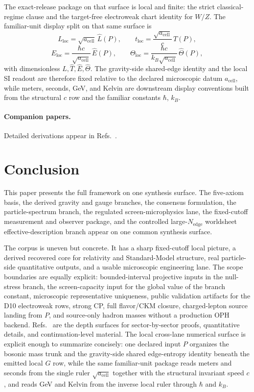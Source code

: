 The exact-release package on that surface is local and finite: the strict classical-regime clause
and the target-free electroweak chart identity for \(W/Z\).
The familiar-unit display split on that same surface is
\[
L_{\mathrm{loc}}=\sqrt{a_{\mathrm{cell}}}\,\widehat L(P),\qquad
t_{\mathrm{loc}}=\frac{\sqrt{a_{\mathrm{cell}}}}{c}\,\widehat T(P),
\]
\[
E_{\mathrm{loc}}=\frac{\hbar c}{\sqrt{a_{\mathrm{cell}}}}\,\widehat E(P),\qquad
\Theta_{\mathrm{loc}}=\frac{\hbar c}{k_B\sqrt{a_{\mathrm{cell}}}}\,\widehat\Theta(P),
\]
with dimensionless \(\widehat L,\widehat T,\widehat E,\widehat\Theta\). The gravity-side
shared-edge identity and the local SI readout are therefore fixed relative to the declared
microscopic datum \(a_{\mathrm{cell}}\), while meters, seconds, GeV, and Kelvin are downstream
display conventions built from the structural \(c\) row and the familiar constants \(\hbar\),
\(k_B\).

\paragraph{Companion papers.}
Detailed derivations appear in Refs.~\cite{ophcompact,ophconsensus,ophmicrophysics,ophparticles}.

\section{Conclusion}

This paper presents the full framework on one synthesis surface. The five-axiom basis, the
derived gravity and gauge branches, the consensus formulation, the particle-spectrum branch,
the regulated screen-microphysics lane, the fixed-cutoff measurement and observer package, and the
controlled large-\(N_{\mathrm{edge}}\) worldsheet effective-description branch appear on one
common synthesis surface.

The corpus is uneven but concrete. It has a sharp
fixed-cutoff local picture, a derived recovered core for relativity and Standard-Model
structure, real particle-side quantitative outputs, and a usable microscopic engineering lane. The
scope boundaries are equally explicit: bounded-interval projective inputs in the null-stress
branch, the screen-capacity input for the global value of the branch constant, microscopic
representative uniqueness, public validation artifacts for the D10 electroweak rows, strong CP,
full flavor/CKM closure, charged-lepton source landing from \(P\), and source-only hadron masses
without a production OPH backend.
Refs.~\cite{ophcompact,ophconsensus,ophmicrophysics,ophparticles} are the depth surfaces for
sector-by-sector proofs, quantitative details, and continuation-level material. The local
cross-lane numerical surface is explicit enough to summarize concisely: one declared input \(P\)
organizes the bosonic mass trunk and the gravity-side shared edge-entropy identity beneath the
emitted local \(G\) row, while the same familiar-unit package reads meters and seconds from the
single ruler \(\sqrt{a_{\mathrm{cell}}}\) together with the structural invariant speed \(c\), and
reads GeV and Kelvin from the inverse local ruler through \(\hbar\) and \(k_B\).
